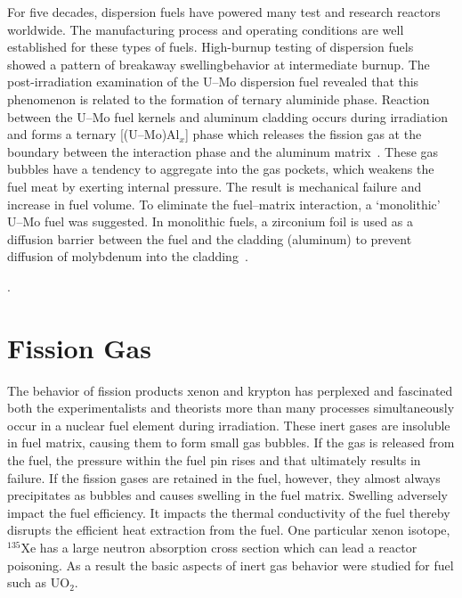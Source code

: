 For five decades, dispersion fuels have powered many test and research reactors worldwide. The manufacturing process and operating conditions are well established for these types of fuels. High-burnup testing of dispersion fuels showed a pattern of \mbox{breakaway} swelling\footnotemark\@ behavior at intermediate burnup. The post-irradiation examination of the U--Mo dispersion fuel revealed that this phenomenon is related to the formation of ternary aluminide phase. Reaction between the U--Mo fuel kernels and aluminum cladding occurs during irradiation and forms a ternary [(U--Mo)Al$_x$] phase which releases the fission gas at the boundary between the interaction phase and the aluminum matrix~\cite{leenaers2004post,jue2014microstructural,van2008transmission, olander2009growth}. These gas bubbles have a tendency to aggregate into the gas pockets, which weakens the fuel meat by exerting internal pressure. The result is mechanical failure and increase in fuel volume. To eliminate the fuel--matrix interaction, a `monolithic' U--Mo fuel was suggested. In monolithic fuels, a zirconium foil is used as a diffusion barrier between the fuel and the cladding (aluminum) to prevent diffusion of molybdenum into the cladding~\cite{jue2014microstructural}.

.



\section{Fission Gas}
The behavior of fission products xenon and krypton has perplexed and fascinated both the experimentalists and theorists more than many processes simultaneously occur in a nuclear fuel element during irradiation. These inert gases are insoluble in fuel matrix, causing them to form small gas bubbles. If the gas is released from the fuel, the pressure within the fuel pin rises and that ultimately results in failure. If the fission gases are retained in the fuel, however, they almost always precipitates as bubbles and causes swelling in the fuel matrix. Swelling adversely impact the fuel efficiency. It impacts the thermal conductivity of the fuel thereby disrupts the efficient heat extraction from the fuel. One particular xenon isotope, $^{135}$Xe has a large neutron absorption cross section which can lead a reactor poisoning. As a result the basic aspects of inert gas behavior were studied for fuel such as UO$_2$.

